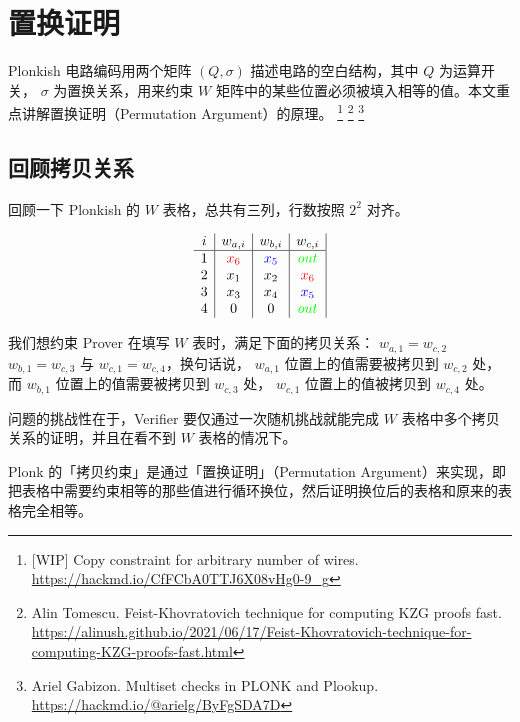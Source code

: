 \hypertarget{ux7406ux89e3-plonkux4e09ux7f6eux6362ux8bc1ux660e}{%
\chapter{置换证明}\label{ux7406ux89e3-plonkux4e09ux7f6eux6362ux8bc1ux660e}} 

Plonkish 电路编码用两个矩阵 \((Q,\sigma)\) 描述电路的空白结构，其中
\(Q\) 为运算开关， \(\sigma\) 为置换关系，用来约束 \(W\)
矩阵中的某些位置必须被填入相等的值。本文重点讲解置换证明（Permutation
Argument）的原理。 \footnote{[WIP] Copy constraint for arbitrary number of wires. \url{https://hackmd.io/CfFCbA0TTJ6X08vHg0-9_g}} 
\footnote{Alin Tomescu. Feist-Khovratovich technique for computing KZG proofs fast. \url{https://alinush.github.io/2021/06/17/Feist-Khovratovich-technique-for-computing-KZG-proofs-fast.html}}
\footnote{Ariel Gabizon. Multiset checks in PLONK and Plookup. \url{https://hackmd.io/@arielg/ByFgSDA7D}}

\hypertarget{ux56deux987eux62f7ux8d1dux5173ux7cfb}{%
\section{回顾拷贝关系}\label{ux56deux987eux62f7ux8d1dux5173ux7cfb}}

回顾一下 Plonkish 的 \(W\) 表格，总共有三列，行数按照 \(2^2\) 对齐。

\[
\begin{array}{c|c|c|c|}
i & w_{a,i} & w_{b,i} & w_{c,i}  \\
\hline
1 & {\color{red}x_6} & {\color{blue}x_5} & {\color{green}out} \\
2 & x_1 & x_2 & {\color{red}x_6} \\
3 & x_3 & x_4 & {\color{blue}x_5} \\
4 & 0 & 0 & {\color{green}out} \\
\end{array}
\]

我们想约束 Prover 在填写 \(W\) 表时，满足下面的拷贝关系：
\(w_{a,1}=w_{c,2}\) \(w_{b,1}=w_{c,3}\) 与
\(w_{c,1}=w_{c,4}\)，换句话说， \(w_{a,1}\) 位置上的值需要被拷贝到
\(w_{c,2}\) 处，而 \(w_{b,1}\) 位置上的值需要被拷贝到 \(w_{c,3}\) 处，
\(w_{c,1}\) 位置上的值被拷贝到 \(w_{c,4}\) 处。

问题的挑战性在于，Verifier 要仅通过一次随机挑战就能完成 \(W\)
表格中多个拷贝关系的证明，并且在看不到 \(W\) 表格的情况下。

Plonk 的「拷贝约束」是通过「置换证明」（Permutation
Argument）来实现，即把表格中需要约束相等的那些值进行循环换位，然后证明换位后的表格和原来的表格完全相等。

